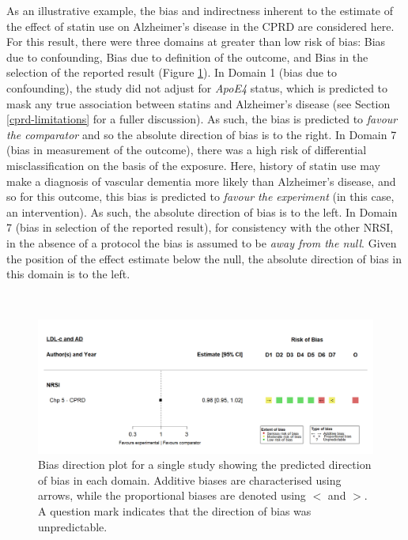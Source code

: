 \documentclass[a4paper, twoside]{templates/ociamthesis}
\begin{document}
As an illustrative example, the bias and indirectness inherent to the estimate of the effect of statin use on Alzheimer's disease in the CPRD are considered here. For this result, there were three domains at greater than low risk of bias: Bias due to confounding, Bias due to definition of the outcome, and Bias in the selection of the reported result (Figure \ref{fig:biasDirectionSingle}). In Domain 1 (bias due to confounding), the study did not adjust for \emph{ApoE4} status, which is predicted to mask any true association between statins and Alzheimer's disease (see Section \ref{cprd-limitations} for a fuller discussion). As such, the bias is predicted to \emph{favour the comparator} and so the absolute direction of bias is to the right. In Domain 7 (bias in measurement of the outcome), there was a high risk of differential misclassification on the basis of the exposure. Here, history of statin use may make a diagnosis of vascular dementia more likely than Alzheimer's disease, and so for this outcome, this bias is predicted to \emph{favour the experiment} (in this case, an intervention). As such, the absolute direction of bias is to the left. In Domain 7 (bias in selection of the reported result), for consistency with the other NRSI, in the absence of a protocol the bias is assumed to be \emph{away from the null}. Given the position of the effect estimate below the null, the absolute direction of bias in this domain is to the left.

~\\




\begin{figure}[H]
\includegraphics[width=1\linewidth]{figures/tri/midlife_AD_single} \caption[Bias direction plot for a single study]{Bias direction plot for a single study showing the predicted direction of bias in each domain. Additive biases are characterised using arrows, while the proportional biases are denoted using \(<\) and \(>\). A question mark indicates that the direction of bias was unpredictable.}\label{fig:biasDirectionSingle}
\end{figure}
\end{document}
